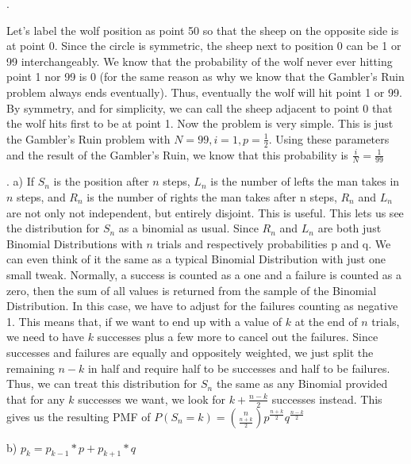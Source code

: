 \documentclass[11pt]{article}
\begin{document}
\bigskip


. 
    
    Let's label the wolf position as point 50 so that the sheep on the opposite side is at point 0.  Since the circle is symmetric, the sheep next to position 0 can be 1 or 99 interchangeably.  We know that the probability of the wolf never ever hitting point 1 nor 99 is 0 (for the same reason as why we know that the Gambler's Ruin problem always ends eventually).  Thus, eventually the wolf will hit point 1 or 99.  By symmetry, and for simplicity, we can call the sheep adjacent to point 0 that the wolf hits first to be at point 1.  Now the problem is very simple.  This is just the Gambler's Ruin problem with $N=99, i=1, p=\frac{1}{2}$. Using these parameters and the result of the Gambler's Ruin, we know that this probability is $\frac{i}{N} = \boxed{\frac{1}{99}}$

\bigskip

. 
\smallskip
    a) If $S_n$ is the position after $n$ steps, $L_n$ is the number of lefts the man takes in $n$ steps, and $R_n$ is the number of rights the man takes after n steps, $R_n$ and $L_n$ are not only not independent, but entirely disjoint. This is useful.  This lets us see the distribution for $S_n$ as a binomial as usual.  Since $R_n$ and $L_n$ are both just Binomial Distributions with $n$ trials and respectively probabilities p and q. We can even think of it the same as a typical Binomial Distribution with just one small tweak.  Normally, a success is counted as a one and a failure is counted as a zero, then the sum of all values is returned from the sample of the Binomial Distribution.  In this case, we have to adjust for the failures counting as negative 1.  This means that, if we want to end up with a value of $k$ at the end of $n$ trials, we need to have $k$ successes plus a few more to cancel out the failures.  Since successes and failures are equally and oppositely weighted, we just split the remaining $n-k$ in half and require half to be successes and half to be failures.  Thus, we can treat this distribution for $S_n$ the same as any Binomial provided that for any $k$ successes we want, we look for $k+\frac{n-k}{2}$ successes instead. This gives us the resulting PMF of $\boxed{P(S_n=k) = \binom{n}{\frac{n+k}{2}}p^{\frac{n+k}{2}}q^{\frac{n-k}{2}}}$
\smallskip

    b) $p_k = p_{k-1}*p + p_{k+1}*q$

\smallskip
\end{document}
